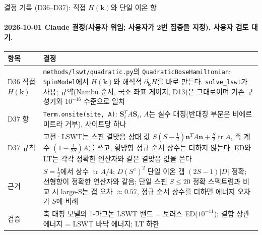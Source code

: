 \begin{frame}[label=decisions-d36-onsite]{결정 기록 (D36--D37): 직접 $H(\mathbf k)$와 단일 이온 항}
  \framesubtitle{2026-10-01 Claude 결정(사용자 위임; 사용자가 2번 집중을 지정), 사용자 검토 대기.}
  \small\renewcommand{\arraystretch}{1.12}
  \begin{tabularx}{\textwidth}{@{}P{3.0cm}Y@{}}
    \toprule
    항목 & 결정 \\
    \midrule
    D36 직접 $H(\mathbf k)$ & \texttt{methods/lswt/quadratic.py}의 \texttt{QuadraticBoseHamiltonian}: \texttt{SpinModel}에서 $H(\mathbf k)$와 해석적 $\partial_{\mathbf k}H$를 바로 만든다. \texttt{solve\_lswt}가 사용; 규약(Nambu 순서, 국소 좌표 게이지, D13)은 그대로이며 기존 구성기와 $10^{-16}$ 수준으로 일치 \\
    D37 항 & \texttt{Term.onsite(site, A)}: $\mathbf S_i^{T}A\mathbf S_i$, $A$는 실수 대칭(반대칭 부분은 비에르미트라 거부), 사이트당 하나 \\
    D37 규칙 & 고전·LSWT는 스핀 결맞음 상태 값 $S(S-\tfrac12)\mathbf n^{T}A\mathbf n+\tfrac S2\operatorname{tr}A$, 즉 계수 $(1-\tfrac1{2S})A$를 쓰고, 횡방향 정규 순서 상수는 더하지 않는다. ED와 LT는 각각 정확한 연산자와 같은 결맞음 값을 쓴다 \\
    근거 & $S=\tfrac12$에서 상수 $\operatorname{tr}A/4$; $D(S^z)^2$ 단일 이온 갭 $(2S-1)|D|$ 정확; 선형항이 정확한 연산자와 같음; 단일 스핀 $S\le20$ 정확 스펙트럼과 비교 시 large-S는 갭 오차 $\approx0.57$, 정규 순서 상수를 더하면 에너지 오차가 $S$에 비례 \\
    검증 & 축 대칭 모델의 1-마그논 LSWT 밴드 = 토러스 ED($10^{-11}$); 결합 상관 에너지 = LSWT 바닥 에너지; LT 하한 \\
    \bottomrule
  \end{tabularx}
\end{frame}

